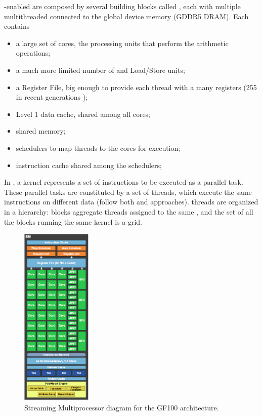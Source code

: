 \documentclass[../thesis]{subfiles}
\begin{document}
	\cuda-enabled \gpus are composed by several building blocks called \gpcs, each with multiple multithreaded \sms connected to the global device memory (GDDR5 DRAM). Each \sm contains
	\begin{itemize}
		\item a large set of \cuda cores, the processing units that perform the arithmetic operations;
		\item a much more limited number of \sfus and Load/Store units;
		\item a Register File, big enough to provide each thread with a many registers (255 in recent generations \cite{NVIDIA:KEPLER});
		\item Level 1 data cache, shared among all cores;
		\item shared memory;
		\item schedulers to map threads to the cores for execution;
		\item instruction cache shared among the schedulers;
	\end{itemize}

	In \cuda, a kernel represents a set of instructions to be executed as a parallel task. These parallel tasks are constituted by a set of \cuda threads, which execute the same instructions on different data (follow both \simd and \simt approaches). \cuda threads are organized in a hierarchy: blocks aggregate threads assigned to the same \sm, and the set of all the blocks running the same kernel is a grid.

	\begin{figure}
		\centering
		\includegraphics[width=0.3\textwidth]{assets/images/cuda/arch/sm.png}
		\captionsetup{font=small}
		\caption{Streaming Multiprocessor diagram for the GF100 architecture.}
		\label{fig:gf100}
	\end{figure}
\end{document}
